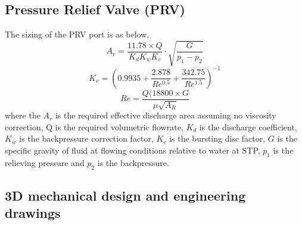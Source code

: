 \subsection{Pressure Relief Valve (PRV)}
The sizing of the PRV port is as below,
\begin{equation}
    A_r = \frac{11.78 \times Q}{K_d K_w K_c} \cdot \sqrt{\frac{G}{p_1-p_2}}
\end{equation}
\begin{equation}
    K_v = (0.9935 + \frac{2.878}{Re^{0.5}} + \frac{342.75}{Re^{1.5}})^{-1}
\end{equation}
\begin{equation}
    Re = \frac{Q(18800 \times G}{\mu \sqrt{A_R}}
\end{equation}
where the $A_r$ is the required effective discharge area assuming no viscosity correction, Q is the required volumetric flowrate, $K_d$ is the discharge coefficient, $K_w$ is the backpressure correction factor, $K_c$ is the bursting disc factor, $G$ is the specific gravity of fluid at flowing conditions relative to water at STP, $p_1$ is the relieving pressure and $p_2$ is the backpressure. 

\subsection{3D mechanical design and engineering drawings}

